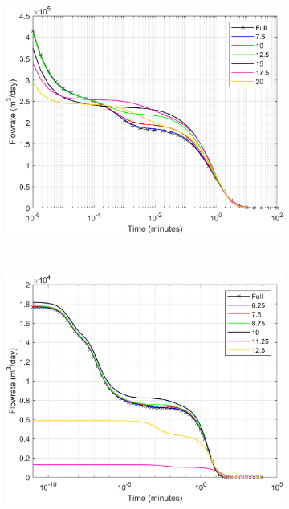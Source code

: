 \documentclass[Supplementary.tex]{subfiles}
\begin{document}
\begin{figure}[ht]
\begin{subfigure}{0.3\textwidth}
        \label{fig:3D_DD_8}
     \end{subfigure}
     \begin{subfigure}{0.3\textwidth}
        \includegraphics[width=\textwidth]{3D_DD/Plot_Drawdown_Case_09_nohead.png}
        \label{fig:3D_DD_9}
     \end{subfigure}
     \\
     \begin{subfigure}{0.3\textwidth}
        \includegraphics[width=\textwidth]{3D_DD/Plot_Drawdown_Case_10_nohead.png}

\end{subfigure}
\end{figure}
\end{document}
